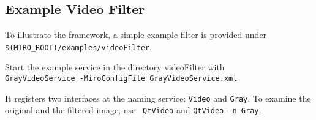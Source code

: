\subsection{Example Video Filter}

To illustrate the framework, a simple example filter is provided under
{\tt \$(MIRO\_ROOT)/examples/videoFilter}.

Start the example service in the directory videoFilter with \\
{\tt GrayVideoService -MiroConfigFile GrayVideoService.xml}

It registers two interfaces at the naming service: {\tt Video} and
{\tt Gray}. To examine the original and the filtered image, use {\tt
  QtVideo} and {\tt QtVideo -n Gray}.

